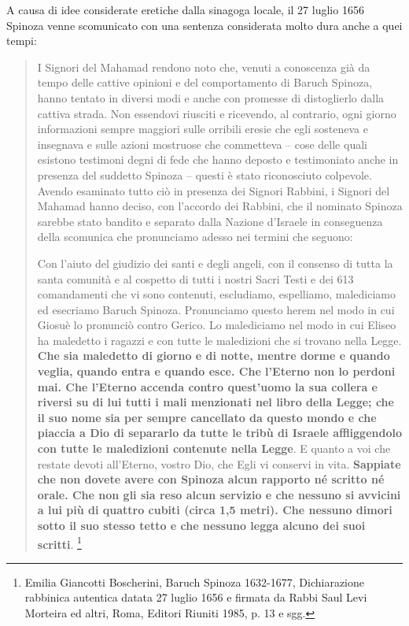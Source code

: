 A causa di idee considerate eretiche dalla sinagoga locale, il 27 luglio 1656 Spinoza venne scomunicato con una sentenza considerata molto dura anche a quei tempi:
\begin{quotation}
	\small I Signori del Mahamad rendono noto che, venuti a conoscenza già da tempo delle cattive opinioni e del comportamento di Baruch Spinoza, hanno tentato in diversi modi e anche con promesse di distoglierlo dalla cattiva strada. Non essendovi riusciti e ricevendo, al contrario, ogni giorno informazioni sempre maggiori sulle orribili eresie che egli sosteneva e insegnava e sulle azioni mostruose che commetteva – cose delle quali esistono testimoni degni di fede che hanno deposto e testimoniato anche in presenza del suddetto Spinoza – questi è stato riconosciuto colpevole. Avendo esaminato tutto ciò in presenza dei Signori Rabbini, i Signori del Mahamad hanno deciso, con l'accordo dei Rabbini, che il nominato Spinoza sarebbe stato bandito e separato dalla Nazione d'Israele in conseguenza della scomunica che pronunciamo adesso nei termini che seguono:
	
	Con l'aiuto del giudizio dei santi e degli angeli, con il consenso di tutta la santa comunità e al cospetto di tutti i nostri Sacri Testi e dei 613 comandamenti che vi sono contenuti, escludiamo, espelliamo, malediciamo ed esecriamo Baruch Spinoza. Pronunciamo questo herem nel modo in cui Giosuè lo pronunciò contro Gerico. Lo malediciamo nel modo in cui Eliseo ha maledetto i ragazzi e con tutte le maledizioni che si trovano nella Legge. \textbf{Che sia maledetto di giorno e di notte, mentre dorme e quando veglia, quando entra e quando esce. Che l'Eterno non lo perdoni mai. Che l'Eterno accenda contro quest'uomo la sua collera e riversi su di lui tutti i mali menzionati nel libro della Legge; che il suo nome sia per sempre cancellato da questo mondo e che piaccia a Dio di separarlo da tutte le tribù di Israele affliggendolo con tutte le maledizioni contenute nella Legge}. E quanto a voi che restate devoti all'Eterno, vostro Dio, che Egli vi conservi in vita. \textbf{Sappiate che non dovete avere con Spinoza alcun rapporto né scritto né orale. Che non gli sia reso alcun servizio e che nessuno si avvicini a lui più di quattro cubiti (circa 1,5 metri). Che nessuno dimori sotto il suo stesso tetto e che nessuno legga alcuno dei suoi scritti}. \footnote{ Emilia Giancotti Boscherini, Baruch Spinoza 1632-1677, Dichiarazione rabbinica autentica datata 27 luglio 1656 e firmata da Rabbi Saul Levi Morteira ed altri, Roma, Editori Riuniti 1985, p. 13 e sgg.}
\end{quotation}

